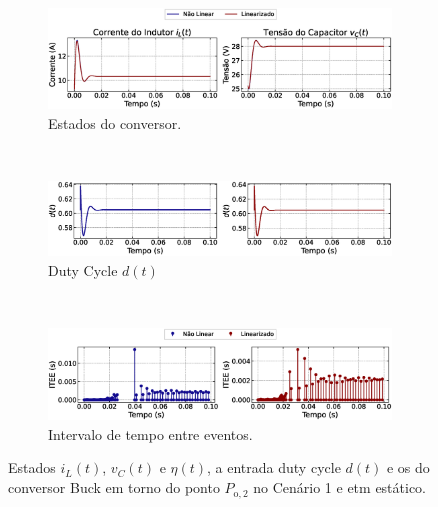 \begin{figure}[H]
  \centering
  \captionsetup{justification=centering}
  \begin{subfigure}{1.\textwidth}
    \centering
    \includegraphics[width=1.\textwidth]{figuras/dynamic-etm/buck/sim1/op2/result.eps}
    \caption{Estados do conversor.}
    \label{fig:buck_converter_constant_pcpl_dynamic_etm_op2_a}
  \end{subfigure}
  \\[6pt]
  \begin{subfigure}{1.\textwidth}
    \centering
    \includegraphics[width=1.\textwidth]{figuras/dynamic-etm/buck/sim1/op2/duty-cycle.eps}
    \caption{Duty Cycle $d(t)$}
    \label{fig:buck_converter_constant_pcpl_dynamic_etm_op2_b}
  \end{subfigure}
  \\[6pt]
  \begin{subfigure}{1.\textwidth}
    \centering
    \includegraphics[width=1.\textwidth]{figuras/dynamic-etm/buck/sim1/op2/inter-event-times.eps}
    \caption{Intervalo de tempo entre eventos.}
    \label{fig:buck_converter_constant_pcpl_dynamic_etm_op2_c}
  \end{subfigure}
  \caption{Estados $i_L(t)$, $v_C(t)$ e $\eta(t)$, a entrada duty cycle $d(t)$ e os  do conversor Buck em torno do ponto $P_{\mathrm{o}, 2}$ no Cenário 1 e \acrshort{etm} estático.}
  \label{fig:buck_converter_constant_pcpl_dynamic_etm_op2}
\end{figure}


